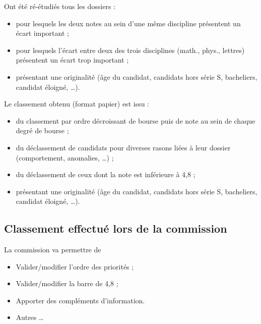 \documentclass{beamer}
\begin{document}
\begin{frame}
Ont été ré-étudiés  tous les dossiers  : 
  \begin{itemize}
  \item  pour lesquels les deux notes au sein d'une même discipline présentent un écart important ;
  \item  pour lesquels l'écart entre deux des trois disciplines (math., phys., lettres) présentent un écart trop important ;
  \item  présentant une originalité (âge du candidat, candidats hors série S, bacheliers, candidat éloigné, \ldots).
  \end{itemize}
\end{frame}

\begin{frame}
Le classement obtenu (format papier) est issu :
  \begin{itemize}
  \item  du classement par ordre décroissant de bourse puis de note au sein de chaque degré de bourse ;
  \item  du déclassement de candidats pour diverses rasons liées à leur dossier (comportement, anomalies, \ldots) ;
  \item  du déclassement de ceux dont la note est inférieure à 4,8 ;
  \item  présentant une originalité (âge du candidat, candidats hors série S, bacheliers, candidat éloigné, \ldots).
  \end{itemize}
\end{frame}

\subsection{Classement effectué lors de la  commission}
\begin{frame}
La commission va permettre de 
  \begin{itemize}
  \item Valider/modifier l'ordre des priorités ;
  \item Valider/modifier la barre de 4,8 ;
  \item Apporter des compléments d'information.
  \item Autres \ldots
  \end{itemize}
\end{frame}
\end{document}
